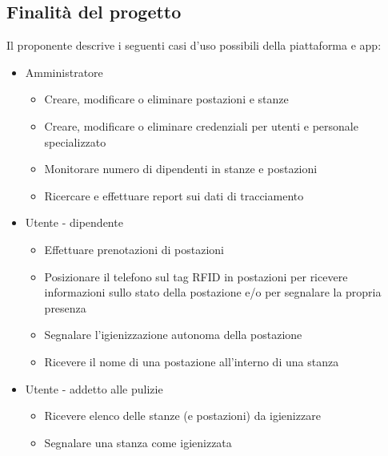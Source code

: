\subsection{Finalità del progetto}
Il proponente descrive i seguenti casi d'uso possibili della piattaforma e app:
\begin{itemize}
    \item Amministratore
    \begin{itemize}
        \item Creare, modificare o eliminare postazioni e stanze
        \item Creare, modificare o eliminare credenziali per utenti e personale specializzato
        \item Monitorare numero di dipendenti in stanze e postazioni
        \item Ricercare e effettuare report sui dati di tracciamento
    \end{itemize}
    \item Utente - dipendente
    \begin{itemize}
        \item Effettuare prenotazioni di postazioni
        \item Posizionare il telefono sul tag RFID in postazioni per ricevere informazioni sullo stato della postazione e/o per segnalare la propria presenza
        \item Segnalare l'igienizzazione autonoma della postazione
        \item Ricevere il nome di una postazione all'interno di una stanza
    \end{itemize}
    \item Utente - addetto alle pulizie
    \begin{itemize}
        \item Ricevere elenco delle stanze (e postazioni) da igienizzare
        \item Segnalare una stanza come igienizzata
    \end{itemize}
\end{itemize}
